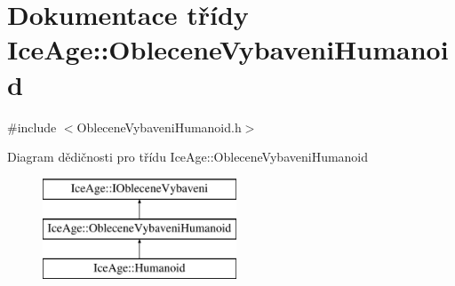 \hypertarget{classIceAge_1_1ObleceneVybaveniHumanoid}{}\section{Dokumentace třídy Ice\+Age\+:\+:Oblecene\+Vybaveni\+Humanoid}
\label{classIceAge_1_1ObleceneVybaveniHumanoid}


{\ttfamily \#include $<$Oblecene\+Vybaveni\+Humanoid.\+h$>$}

Diagram dědičnosti pro třídu Ice\+Age\+:\+:Oblecene\+Vybaveni\+Humanoid\begin{figure}[H]
\begin{center}
\leavevmode
\includegraphics[height=3.000000cm]{d7/d1d/classIceAge_1_1ObleceneVybaveniHumanoid}
\end{center}
\end{figure}
